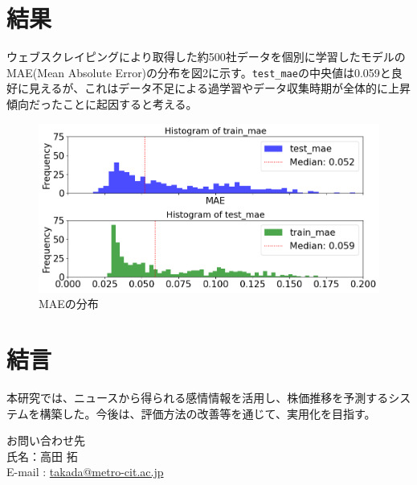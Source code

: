 \documentclass[a4paper, 10pt]{article}
\begin{document}
\section{結果}



ウェブスクレイピングにより取得した約500社データを個別に学習したモデルのMAE(Mean Absolute Error)の分布を図2に示す。\texttt{test\_mae}の中央値は0.059と良好に見えるが、これはデータ不足による過学習やデータ収集時期が全体的に上昇傾向だったことに起因すると考える。



\begin{figure}[H]
    \centering
    \includegraphics[width=0.9\columnwidth]{./assets/graph.png}
    \caption{MAEの分布}
\end{figure}

\section{結言}

本研究では、ニュースから得られる感情情報を活用し、株価推移を予測するシステムを構築した。今後は、評価方法の改善等を通じて、実用化を目指す。



\noindent
{}

お問い合わせ先\\
氏名：高田 拓 \\
E-mail : \href{mailto:takada@metro-cit.ac.jp}{takada@metro-cit.ac.jp}
\end{document}
